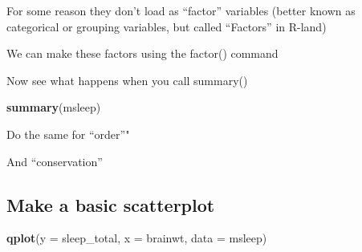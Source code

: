 \documentclass[]{book}
\newenvironment{Shaded}{\begin{snugshade}}{\end{snugshade}}
\newcommand{\KeywordTok}[1]{\textcolor[rgb]{0.13,0.29,0.53}{\textbf{#1}}}
\newcommand{\DataTypeTok}[1]{\textcolor[rgb]{0.13,0.29,0.53}{#1}}
\newcommand{\StringTok}[1]{\textcolor[rgb]{0.31,0.60,0.02}{#1}}
\newcommand{\OperatorTok}[1]{\textcolor[rgb]{0.81,0.36,0.00}{\textbf{#1}}}
\newcommand{\NormalTok}[1]{#1}
\theoremstyle{definition}
\theoremstyle{definition}
\theoremstyle{definition}
\theoremstyle{remark}
\begin{document}
For some reason they don't load as ``factor'' variables (better known as
categorical or grouping variables, but called ``Factors'' in R-land)

We can make these factors using the factor() command

\begin{Shaded}
\end{Shaded}

Now see what happens when you call summary()

\begin{Shaded}
\begin{Highlighting}[]
\KeywordTok{summary}\NormalTok{(msleep)}
\end{Highlighting}
\end{Shaded}

Do the same for ``order''"

\begin{Shaded}
\end{Shaded}

And ``conservation''

\begin{Shaded}
\end{Shaded}

\subsection{Make a basic scatterplot}\label{make-a-basic-scatterplot}

\begin{Shaded}
\begin{Highlighting}[]
\KeywordTok{qplot}\NormalTok{(}\DataTypeTok{y =}\NormalTok{ sleep_total,}
      \DataTypeTok{x =}\NormalTok{ brainwt, }
      \DataTypeTok{data =}\NormalTok{ msleep)}
\end{Highlighting}
\end{Shaded}
\end{document}
